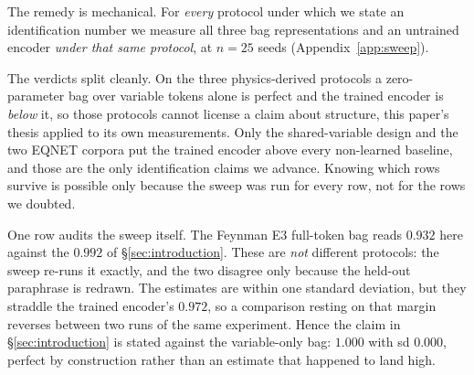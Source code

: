 The remedy is mechanical. For \emph{every} protocol under which we state an identification number we
measure all three bag representations and an untrained encoder \emph{under that same protocol}, at
$n{=}25$ seeds (Appendix~\ref{app:sweep}).


The verdicts split cleanly. On the three physics-derived protocols a zero-parameter bag over
variable tokens alone is perfect and the trained encoder is \emph{below} it, so those protocols
cannot license a claim about structure, this paper's thesis applied to its own measurements. Only
the shared-variable design and the two EQNET corpora put the trained encoder above every non-learned
baseline, and those are the only identification claims we advance. Knowing which rows survive is
possible only because the sweep was run for every row, not for the rows we doubted.

One row audits the sweep itself. The Feynman E3 full-token bag reads $0.932$ here against the
$0.992$ of \S\ref{sec:introduction}. These are \emph{not} different protocols: the sweep re-runs
it exactly, and the two disagree only because the held-out paraphrase is redrawn. The estimates are
within one standard deviation, but they straddle the trained encoder's $0.972$, so a comparison
resting on that margin reverses between two runs of the same experiment. Hence the claim in
\S\ref{sec:introduction} is stated against the variable-only bag: $1.000$ with sd $0.000$, perfect
by construction rather than an estimate that happened to land high.
